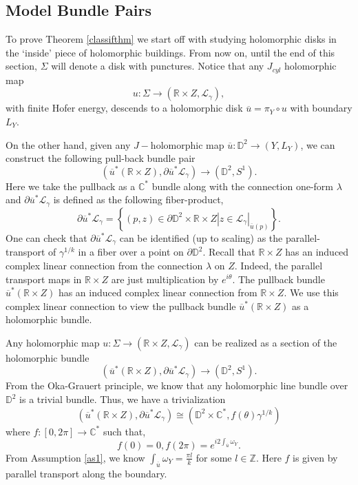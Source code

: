 \documentclass[11pt, oneside,dvipsnames]{amsart}
\newcommand{\of}{\circ}
\renewcommand{\to}{\rightarrow}
\renewcommand{\to}{\rightarrow}
\newcommand{\<}{\langle}
\renewcommand{\>}{\rangle}
\newcommand{\bC}{\mathbb{C}}
\newcommand{\bD}{\mathbb{D}}
\newcommand{\bR}{\mathbb{R}}
\newcommand{\bZ}{\mathbb{Z}}
\newcommand{\cL}{\mathcal{L}}
\renewcommand{\to}{\rightarrow}
\theoremstyle{definition}
\theoremstyle{definition}
\numberwithin{equation}{subsection}
\begin{document}
\subsection{Model Bundle Pairs}

To prove Theorem \ref{classifthm} we start off with studying holomorphic disks in the `inside' piece of holomorphic buildings. From now on, until the end of this section, $\Sigma$ will denote a disk with punctures. Notice that any $J_{cyl}$ holomorphic map
$$u:\Sigma \to (\bR \times Z, \cL_\gamma),$$   with finite Hofer energy, descends to a holomorphic disk $\overline{ u} = \pi_Y \of u$ with boundary $L_Y.$

On the other hand, given any $J-$holomorphic map $\overline{u}: \bD^2 \to (Y,L_Y)$, we can construct the following pull-back bundle pair $$(\overline{u}^* (\bR \times Z), \partial{\overline{u}}^* \cL_\gamma) \to (\bD^2,S^1).$$ Here we take the pullback as a $\bC^*$ bundle along with the connection one-form $\lambda$ and $\partial{\overline{u}}^* \cL_\gamma$ is defined as the following fiber-product, $$\partial{\overline{u}}^* \cL_\gamma=\left\{ (p,z) \in \partial\bD^2 \times \bR \times Z | z\in \cL_\gamma|_{\overline{u}(p)}  \right\}.$$ One can check that $\partial{\overline{u}}^* \cL_\gamma$ can be identified (up to scaling) as the parallel-transport of $\gamma^{1/k}$ in a fiber over a point on $\partial\bD^2$. Recall that $\bR \times Z$ has an induced complex linear connection from the connection $\lambda$ on $Z$. Indeed, the parallel transport maps in $\bR \times Z$ are just multiplication by $e^{i\theta}$.  The pullback bundle $\overline{u}^* (\bR \times Z)$ has an induced complex linear connection from $\bR \times Z$. We use this complex linear connection to view the pullback bundle $\overline{u}^*(\bR \times Z)$ as a holomorphic bundle.

Any holomorphic map $u:\Sigma \to (\bR \times Z, \cL_\gamma)$ can be realized as a section of the holomorphic bundle
\begin{equation*}
(\overline{u}^* (\bR \times Z), \partial{\overline{u}}^* \cL_\gamma) \to (\bD^2,S^1).
\end{equation*}
From the Oka-Grauert principle, we know that any holomorphic line bundle over $\bD^2$ is a trivial bundle. Thus, we have a trivialization \begin{equation}\label{initialiso}  
(\overline{u}^* (\bR \times Z), \partial{\overline{u}}^* \cL_\gamma) \cong (\bD^2 \times \bC^*, f(\theta) \gamma^{1/k} )
\end{equation}where $f:[0,2\pi] \to \bC^*$ such that, $$f(0)=0, f(2\pi) = e^{i2\int_{\overline{u}}\omega_Y}.$$ From Assumption \ref{as1}, we know $\int_{\overline{u}}\omega_Y  = \frac{\pi l}{k}$ for some $l \in \bZ$. Here $f$ is given by parallel transport along the boundary.
\end{document}
